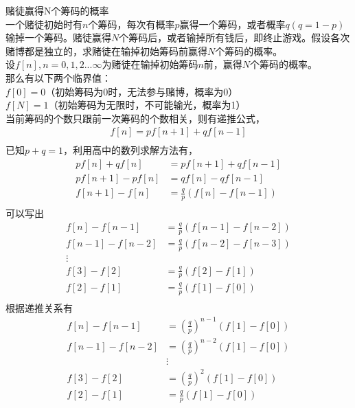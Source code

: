 \documentclass[
]{article}
\begin{document}
赌徒赢得N个筹码的概率\\
一个赌徒初始时有$n$个筹码，每次有概率$p$赢得一个筹码，或者概率$q(q=1-p)$输掉一个筹码。赌徒赢得$N$个筹码后，或者输掉所有钱后，即终止游戏。假设各次赌博都是独立的，求赌徒在输掉初始筹码前赢得$N$个筹码的概率。\\
设$f[n], n=0,1,2...\infty$为赌徒在输掉初始筹码$n$前，赢得$N$个筹码的概率。\\
那么有以下两个临界值：\\
$f[0]=0$（初始筹码为0时，无法参与赌博，概率为0）\\
$f[N]=1$（初始筹码为无限时，不可能输光，概率为1）\\
当前筹码的个数只跟前一次筹码的个数相关，则有递推公式，\\
\begin{equation}
\begin{aligned}
f[n] = pf[n+1] + qf[n-1]\\
\end{aligned}
\end{equation}
已知$p+q=1$，利用高中的数列求解方法有，
\begin{equation}
\begin{aligned}
pf[n] + qf[n] &= pf[n+1] + qf[n-1]\\
pf[n+1] - pf[n] &= qf[n] - qf[n-1]\\
f[n+1] - f[n] &= \frac{q}{p}(f[n] - f[n-1])\\
\end{aligned}
\end{equation}
可以写出\\
\begin{equation}
\begin{aligned}
f[n] - f[n-1] &= \frac{q}{p}(f[n-1] - f[n-2])\\
f[n-1] - f[n-2] &= \frac{q}{p}(f[n-2] - f[n-3])\\
\vdots\\
f[3] - f[2] &= \frac{q}{p}(f[2] - f[1])\\
f[2] - f[1] &= \frac{q}{p}(f[1] - f[0])\\
\end{aligned}
\end{equation}
根据递推关系有\\
\begin{equation}
\begin{aligned}
f[n] - f[n-1] &= (\frac{q}{p})^{n-1}(f[1] - f[0])\\
f[n-1] - f[n-2] &= (\frac{q}{p})^{n-2}(f[1] - f[0])\\
&\vdots\\
f[3] - f[2] &= (\frac{q}{p})^{2}(f[1] - f[0])\\
f[2] - f[1] &= \frac{q}{p}(f[1] - f[0])\\
\end{aligned}
\end{equation}
\end{document}
